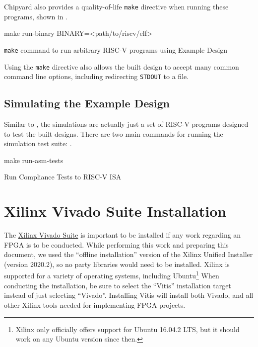 Chipyard also provides a quality-of-life \texttt{make} directive when running these programs, shown in .

\begin{listing}[h!tbp]
\begin{bashsource}
make run-binary BINARY=<path/to/riscv/elf>
\end{bashsource}
\caption{\texttt{make} command to run arbitrary RISC-V programs using Example Design}
\label{lst:Running_Example_Design-Make}
\end{listing}

Using the \texttt{make} directive also allows the built design to accept many common command line options, including redirecting \texttt{STDOUT} to a file.

\subsection{Simulating the Example Design}\label{sec:Simulating_Example_Design}
Similar to , the simulations are actually just a set of RISC-V programs designed to test the built designs.
There are two main commands for running the simulation test suite: .

\begin{listing}[h!tbp]
\begin{bashsource}
make run-asm-tests
\end{bashsource}
\caption{Run Compliance Tests to RISC-V ISA}
\label{lst:ASM_Tests}
\end{listing}


\section{Xilinx Vivado Suite Installation}\label{sec:Xilinx_Vivado_Suide_Install}
The \href{https://www.xilinx.com/support/download.html}{Xilinx Vivado Suite} is important to be installed if any work regarding an FPGA is to be conducted.
While performing this work and preparing this document, we used the ``offline installation'' version of the Xilinx Unified Installer (version 2020.2), so no  party libraries would need to be installed.
Xilinx is supported for a variety of operating systems, including Ubuntu\footnote{Xilinx only officially offers support for Ubuntu 16.04.2 LTS, but it should work on any Ubuntu version since then.}
When conducting the installation, be sure to select the ``Vitis'' installation target instead of just selecting ``Vivado''.
Installing Vitis will install both Vivado, and all other Xilinx tools needed for implementing FPGA projects.

